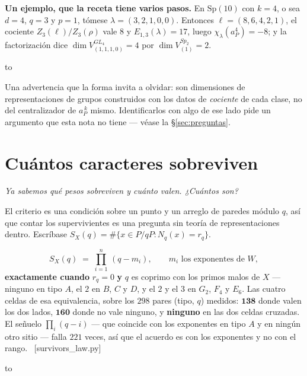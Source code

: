 \documentclass[11pt,a4paper]{article}
\newcommand{\Sp}{\mathrm{Sp}}
\newcommand{\ver}[1]{\unskip\penalty0\ \textcolor{azul}{\small\textsf{[#1]}}}
\newenvironment{keybox}
  {\par\vspace{9pt}\begin{lrbox}{\fichabox}%
   \begin{minipage}{0.90\textwidth}\vspace{7pt}\setlength{\parskip}{3pt}}
  {\vspace{7pt}\end{minipage}\end{lrbox}%
   \par\noindent\hbox to \textwidth{\hfill
   \textcolor{azul}{\rule[-\dp\fichabox]{3.2pt}{\dimexpr\ht\fichabox+\dp\fichabox\relax}}%
   \colorbox{fondoficha}{\usebox{\fichabox}}\hfill}%
   \par\vspace{9pt}}
\begin{document}
\begin{keybox}
\textbf{Un ejemplo, que la receta tiene varios pasos.} En $\Sp(10)$ con $k=4$, o sea $d=4$, $q=3$ y
$p=1$, tómese $\lambda=(3,2,1,0,0)$. Entonces $\ell=(8,6,4,2,1)$, el cociente $Z_3(\ell)/Z_3(\rho)$
vale $8$ y $E_{1,3}(\lambda)=17$, luego $\chi_\lambda(a_P^4)=-8$; y la factorización dice
$\dim V^{GL_4}_{(1,1,1,0)}=4$ por $\dim V^{Sp_2}_{(1)}=2$.
\end{keybox}

\noindent Una advertencia que la forma invita a olvidar: son dimensiones de representaciones de
grupos construidos con los datos de \emph{cociente} de cada clase, no del centralizador de
$a_P^{\,k}$ mismo. Identificarlos con algo de ese lado pide un argumento que esta nota no tiene ---
véase la \S\ref{sec:preguntas}.

\section{Cuántos caracteres sobreviven}\label{sec:cuenta}

\noindent\emph{Ya sabemos qué pesos sobreviven y cuánto valen. ¿Cuántos son?}

El criterio es una condición sobre un punto y un arreglo de paredes módulo $q$, así que contar los
supervivientes es una pregunta sin teoría de representaciones dentro. Escríbase
$S_X(q)=\#\{x\in P/qP: N_q(x)=r_q\}$.


\begin{keybox}
\[
S_X(q)\;=\;\prod_{i=1}^{n}\,(q-m_i),\qquad m_i \text{ los exponentes de } W,
\]
\textbf{exactamente cuando} $r_q=0$ \textbf{y} $q$ es coprimo con los primos malos de $X$ ---
ninguno en tipo $A$, el $2$ en $B$, $C$ y $D$, y el $2$ y el $3$ en $G_2$, $F_4$ y $E_6$. Las cuatro
celdas de esa equivalencia, sobre los $298$ pares (tipo, $q$) medidos: $\mathbf{138}$ donde valen los
dos lados, $\mathbf{160}$ donde no vale ninguno, y \textbf{ninguno} en las dos celdas cruzadas. El
señuelo $\prod_i(q-i)$ --- que coincide con los exponentes en tipo $A$ y en ningún otro sitio ---
falla $221$ veces, así que el acuerdo es con los exponentes y no con el rango.
\ver{survivors\_law.py}
\end{keybox}
\end{document}
